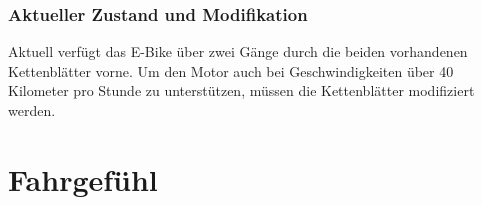 \subsubsection*{Aktueller Zustand und Modifikation}
Aktuell verfügt das E-Bike über zwei Gänge durch die beiden vorhandenen Kettenblätter vorne. Um den Motor auch bei Geschwindigkeiten über 40 Kilometer pro Stunde zu unterstützen, müssen die Kettenblätter modifiziert werden.

\section{Fahrgefühl}



